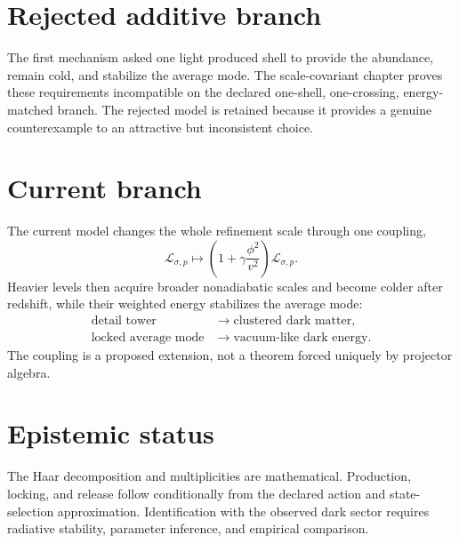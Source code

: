 \section{Rejected additive branch}
The first mechanism asked one light produced shell to provide the abundance, remain cold, and stabilize the average mode. The scale-covariant chapter proves these requirements incompatible on the declared one-shell, one-crossing, energy-matched branch. The rejected model is retained because it provides a genuine counterexample to an attractive but inconsistent choice.
\section{Current branch}
The current model changes the whole refinement scale through one coupling,
\begin{equation}\mathcal L_{\sigma,p}\longmapsto\left(1+\gamma\frac{\phi^2}{v^2}\right)\mathcal L_{\sigma,p}.\end{equation}
Heavier levels then acquire broader nonadiabatic scales and become colder after redshift, while their weighted energy stabilizes the average mode:
\begin{equation}\boxed{\begin{aligned}\text{detail tower}&\longrightarrow\text{clustered dark matter},\\\text{locked average mode}&\longrightarrow\text{vacuum-like dark energy}.\end{aligned}}\end{equation}
The coupling is a proposed extension, not a theorem forced uniquely by projector algebra.
\section{Epistemic status}
The Haar decomposition and multiplicities are mathematical. Production, locking, and release follow conditionally from the declared action and state-selection approximation. Identification with the observed dark sector requires radiative stability, parameter inference, and empirical comparison.
